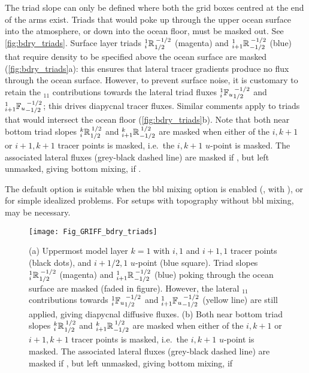 \documentclass[../main/NEMO_manual]{subfiles}
\begin{document}
The triad slope can only be defined where both the grid boxes centred at the end of the arms exist.
Triads that would poke up through the upper ocean surface into the atmosphere,
or down into the ocean floor, must be masked out.
See \autoref{fig:bdry_triads}.
Surface layer triads $\triad{i}{1}{R}{1/2}{-1/2}$ (magenta) and $\triad{i+1}{1}{R}{-1/2}{-1/2}$ (blue) that
require density to be specified above the ocean surface are masked (\autoref{fig:bdry_triads}a):
this ensures that lateral tracer gradients produce no flux through the ocean surface.
However, to prevent surface noise, it is customary to retain the $_{11}$ contributions towards
the lateral triad fluxes $\triad[u]{i}{1}{F}{1/2}{-1/2}$ and $\triad[u]{i+1}{1}{F}{-1/2}{-1/2}$;
this drives diapycnal tracer fluxes.
Similar comments apply to triads that would intersect the ocean floor (\autoref{fig:bdry_triads}b).
Note that both near bottom triad slopes $\triad{i}{k}{R}{1/2}{1/2}$ and
$\triad{i+1}{k}{R}{-1/2}{1/2}$ are masked when either of the $i,k+1$ or $i+1,k+1$ tracer points is masked,
i.e.\ the $i,k+1$ $u$-point is masked.
The associated lateral fluxes (grey-black dashed line) are masked if ,
but left unmasked, giving bottom mixing, if .

The default option  is suitable when the bbl mixing option is enabled
(, with ), or for simple idealized problems.
For setups with topography without bbl mixing,  may be necessary.
\begin{figure}[h]
  \begin{center}
    \texttt{[image: Fig\_GRIFF\_bdry\_triads]}
    \caption{
      \protect\label{fig:bdry_triads}
      (a) Uppermost model layer $k=1$ with $i,1$ and $i+1,1$ tracer points (black dots),
      and $i+1/2,1$ $u$-point (blue square).
      Triad slopes $\triad{i}{1}{R}{1/2}{-1/2}$ (magenta) and $\triad{i+1}{1}{R}{-1/2}{-1/2}$ (blue) poking through
      the ocean surface are masked (faded in figure).
      However, the lateral $_{11}$ contributions towards $\triad[u]{i}{1}{F}{1/2}{-1/2}$ and
      $\triad[u]{i+1}{1}{F}{-1/2}{-1/2}$ (yellow line) are still applied,
      giving diapycnal diffusive fluxes.
      \newline
      (b) Both near bottom triad slopes $\triad{i}{k}{R}{1/2}{1/2}$ and
      $\triad{i+1}{k}{R}{-1/2}{1/2}$ are masked when either of the $i,k+1$ or $i+1,k+1$ tracer points is masked,
      i.e.\ the $i,k+1$ $u$-point is masked.
      The associated lateral fluxes (grey-black dashed line) are masked if
      \protect{}, but left unmasked,
      giving bottom mixing, if \protect{}
    }
  \end{center}
\end{figure}
\end{document}
